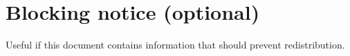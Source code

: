 \chapter{Blocking notice (optional)}

Useful if this document contains information that should prevent redistribution.